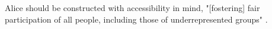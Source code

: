\documentclass[14pt,a4paper]{article}
\begin{document}
\begin{multicols}{2}



Alice should be constructed with accessibility in mind, "[fostering] fair participation of all people, including those of underrepresented groups" \textit{\parencite[p. 2]{ACM2024}}.






\end{multicols}
\end{document}
